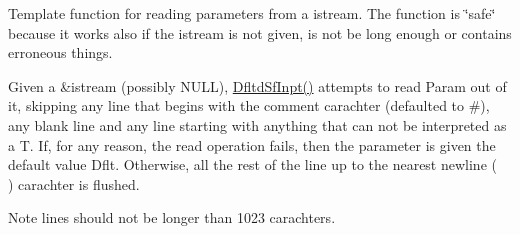 Template function for reading parameters from a istream. The function is \char`\"{}safe\char`\"{} because it works also if the istream is not given, is not be long enough or contains erroneous things.

Given a \&istream (possibly N\+U\+LL), \mbox{\hyperlink{group___o_p_t_utils___f_u_n_c_t_i_o_n_s_gaf4f201a8b54197416f25f062edc98ca6}{Dfltd\+Sf\+Inpt()}} attempts to read Param out of it, skipping any line that begins with the comment carachter (defaulted to \textquotesingle{}\#\textquotesingle{}), any blank line and any line starting with anything that can not be interpreted as a \textquotesingle{}T\textquotesingle{}. If, for any reason, the read operation fails, then the parameter is given the default value \textquotesingle{}Dflt\textquotesingle{}. Otherwise, all the rest of the line up to the nearest newline (\textquotesingle{}~\newline
\textquotesingle{}) carachter is flushed.

\begin{DoxyNote}{Note}
lines should not be longer than 1023 carachters. 
\end{DoxyNote}
